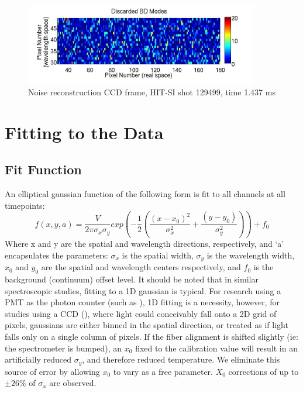 \documentclass{AIAA}
\begin{document}
\begin{center}
\begin{figure}
\end{figure}
\begin{figure}
\includegraphics[width=4in]{BD_Discard}\caption{Noise reconstruction CCD frame, HIT-SI shot 129499, time 1.437 ms}\label{BD Noise}
\end{figure}
\end{center}




\section{Fitting to the Data}\label{sec:Fit}
\subsection{Fit Function}
An elliptical gaussian function of the following form is fit to all channels at all timepoints:
\begin{equation}\label{Gaussian}
f(x,y,a)=\frac{V}{2{\pi}\sigma_x\sigma_y}exp\left(-\frac{1}{2}\left(\frac{(x-x_0)^2}{\sigma_x^2}+\frac{(y-y_0)}{\sigma_y^2}\right)\right)+f_0
\end{equation}
Where x and y are the spatial and wavelength directions, respectively, and `a' encapsulates the parameters: ${\sigma}_x$ is the spatial width, ${\sigma}_y$ is the wavelength width, $x_0$ and $y_0$ are the spatial and wavelength centers respectively, and $f_0$ is the background (continuum) offset level. It should be noted that in similar spectroscopic studies, fitting to a 1D gaussian is typical. For research using a PMT as the photon counter (such as \cite{cothran2006fast}), 1D fitting is a necessity, however, for studies using a CCD (\cite{den1994fast}\cite{rapisarda2007role}\cite{bamford1992combination}), where light could conceivably fall onto a 2D grid of pixels, gaussians are either binned in the spatial direction, or treated as if light falls only on a single column of pixels. If the fiber alignment is shifted slightly (ie: the spectrometer is bumped), an $x_0$ fixed to the calibration value will result in an artificially reduced $\sigma_y$, and therefore reduced temperature. We eliminate this source of error by allowing $x_0$ to vary as a free parameter. $X_0$ corrections of up to $\pm26\%$ of $\sigma_x$ are observed.\\
\end{document}
